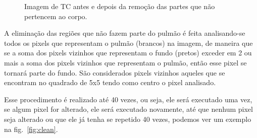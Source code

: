 \begin{figure}[ht]
 \begin{center}
 \end{center}
 \caption{Imagem de TC antes e depois da remoção das partes que não pertencem ao corpo.}
 \label{fig:remocao}
\end{figure}

A eliminação das regiões que não fazem parte do pulmão é feita analisando-se todos os pixels que representam o pulmão (brancos) na imagem, de maneira que se a soma dos pixels vizinhos que representam o fundo (pretos) exceder em 2 ou mais a soma dos pixels vizinhos que representam o pulmão, então esse pixel se tornará parte do fundo. São considerados pixels vizinhos aqueles que se encontram no quadrado de 5x5 tendo como centro o pixel analisado.

Esse procedimento é realizado até 40 vezes, ou seja, ele será executado uma vez, se algum pixel for alterado, ele será executado novamente, até que nenhum pixel seja alterado ou que ele já tenha se repetido 40 vezes, podemos ver um exemplo na fig.~\ref{fig:clean}.


